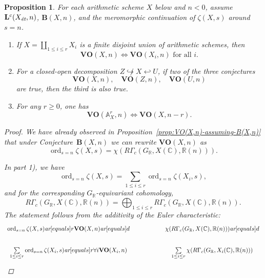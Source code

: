 \documentclass[10pt,a4paper,oneside,draft]{article}
\DeclareMathOperator{\ord}{ord}
\newcommand{\CC}{\mathbb{C}}
\newcommand{\RR}{\mathbb{R}}
\renewcommand{\AA}{\mathbb{A}}
\newcommand{\ar}{\text{\it ar}}
\newcommand{\et}{\text{\it \'{e}t}}
\theoremstyle{myplain}
\newtheorem{proposition}[theorem]{Proposition}
\theoremstyle{mydefinition}
\numberwithin{equation}{section}
\begin{document}
\begin{proposition}
  \label{prop:compatibility-of-VO(X,n)}
  For each arithmetic scheme $X$ below and $n < 0$, assume
  $\mathbf{L}^c (X_\et,n)$, $\mathbf{B} (X,n)$, and the meromorphic continuation
  of $\zeta (X,s)$ around $s = n$.

  \begin{enumerate}
  \item[1)] If $X = \coprod_{1 \le i \le r} X_i$ is a finite disjoint union of
    arithmetic schemes, then
    $$\mathbf{VO} (X,n) \iff \mathbf{VO} (X_i,n)\text{ for all }i.$$

  \item[2)] For a closed-open decomposition
    $Z \not\hookrightarrow X \hookleftarrow U$,
    if two of the three conjectures
    \[ \mathbf{VO} (X,n), \quad
      \mathbf{VO} (Z,n), \quad
      \mathbf{VO} (U,n) \]
    are true, then the third is also true.

  \item[3)] For any $r \ge 0$, one has
    $$\mathbf{VO} (\AA^r_X, n) \iff \mathbf{VO} (X, n-r).$$
  \end{enumerate}

  \begin{proof}
    We have already observed in Proposition~\ref{prop:VO(X,n)-assuming-B(X,n)}
    that under Conjecture~$\mathbf{B} (X,n)$ we can rewrite $\mathbf{VO} (X,n)$
    as
    $$\ord_{s=n} \zeta (X,s) = \chi (R\Gamma_c (G_\RR, X(\CC), \RR (n))).$$

    In part 1), we have
    $$\ord_{s=n} \zeta (X,s) = \sum_{1 \le i \le r} \ord_{s=n} \zeta (X_i,s),$$
    and for the corresponding $G_\RR$-equivariant cohomology,
    \[ R\Gamma_c (G_\RR, X(\CC), \RR (n)) =
      \bigoplus_{1 \le i \le r} R\Gamma_c (G_\RR, X(\CC), \RR (n)). \]
    The statement follows from the additivity of the Euler characteristic:
    \[ \begin{tikzcd}[column sep=5em]
        \ord_{s=n} \zeta (X,s) \ar[equals]{r}{\mathbf{VO} (X,n)}\ar[equals]{d} & \chi (R\Gamma_c (G_\RR, X(\CC), \RR (n))) \ar[equals]{d} \\
        \sum\limits_{1 \le i \le r} \ord_{s=n} \zeta (X_i,s) \ar[equals]{r}{\forall i \mathbf{VO} (X_i,n)} & \sum\limits_{1 \le i \le r} \chi (R\Gamma_c (G_\RR, X_i (\CC), \RR (n)))
      \end{tikzcd} \]


\end{proof}
\end{proposition}
\end{document}
